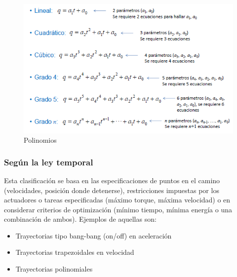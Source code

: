         \begin{figure}[htb]
            \centering
            \includegraphics[width=1\linewidth]{Main/Chapter4/Images4/cap4_tray_5.png}
            \caption{Polinomios \cite{tray_utec}}
            \label{f:Cap4_tray_5}
        \end{figure}              
            
        \newpage   

        
        \subsubsection{Según la ley temporal }
            Esta clasificación se basa en las especificaciones de puntos en el camino (velocidades, posición donde detenerse), restricciones impuestas por los actuadores o tareas especificadas (máximo torque, máxima velocidad) o en considerar criterios de optimización (mínimo tiempo, mínima energía o una combinación de ambos).  Ejemplos de aquellas son:
            \begin{itemize}
                \item   Trayectorias tipo bang-bang (on/off) en aceleración
                \item   Trayectorias trapezoidales en velocidad
                \item   Trayectorias polinomiales
            \end{itemize}
            
